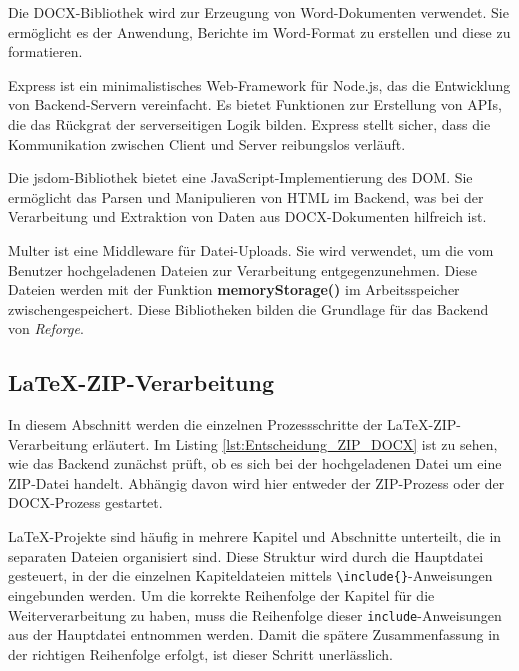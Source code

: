 Die \ac{DOCX}-Bibliothek wird zur Erzeugung von Word-Dokumenten verwendet. Sie ermöglicht es der Anwendung, Berichte im Word-Format zu erstellen und diese zu formatieren.

Express ist ein minimalistisches Web-Framework für Node.js, das die Entwicklung von Backend-Servern vereinfacht. Es bietet Funktionen zur Erstellung von \ac{API}s, die das Rückgrat der serverseitigen Logik bilden. Express stellt sicher, dass die Kommunikation zwischen Client und Server reibungslos verläuft.

Die jsdom-Bibliothek bietet eine JavaScript-Implementierung des \ac{DOM}. Sie ermöglicht das Parsen und Manipulieren von \ac{HTML} im Backend, was bei der Verarbeitung und Extraktion von Daten aus \ac{DOCX}-Dokumenten hilfreich ist.

Multer ist eine Middleware für Datei-Uploads. Sie wird verwendet, um die vom Benutzer hochgeladenen Dateien zur Verarbeitung entgegenzunehmen. Diese Dateien werden mit der Funktion \textbf{memoryStorage()} im Arbeitsspeicher zwischengespeichert. Diese Bibliotheken bilden die Grundlage für das Backend von \textit{Reforge}.

\subsection{LaTeX-ZIP-Verarbeitung}

In diesem Abschnitt werden die einzelnen Prozessschritte der LaTeX-ZIP-Verarbeitung erläutert. Im Listing \ref{lst:Entscheidung_ZIP_DOCX} ist zu sehen, wie das Backend zunächst prüft, ob es sich bei der hochgeladenen Datei um eine ZIP-Datei handelt. Abhängig davon wird hier entweder der ZIP-Prozess oder der \ac{DOCX}-Prozess gestartet.


LaTeX-Projekte sind häufig in mehrere Kapitel und Abschnitte unterteilt, die in separaten Dateien organisiert sind. Diese Struktur wird durch die Hauptdatei gesteuert, in der die einzelnen Kapiteldateien mittels \texttt{\textbackslash include\{\}}-Anweisungen eingebunden werden. Um die korrekte Reihenfolge der Kapitel für die Weiterverarbeitung zu haben, muss die Reihenfolge dieser \texttt{include}-Anweisungen aus der Hauptdatei entnommen werden. Damit die spätere Zusammenfassung in der richtigen Reihenfolge erfolgt, ist dieser Schritt unerlässlich.

